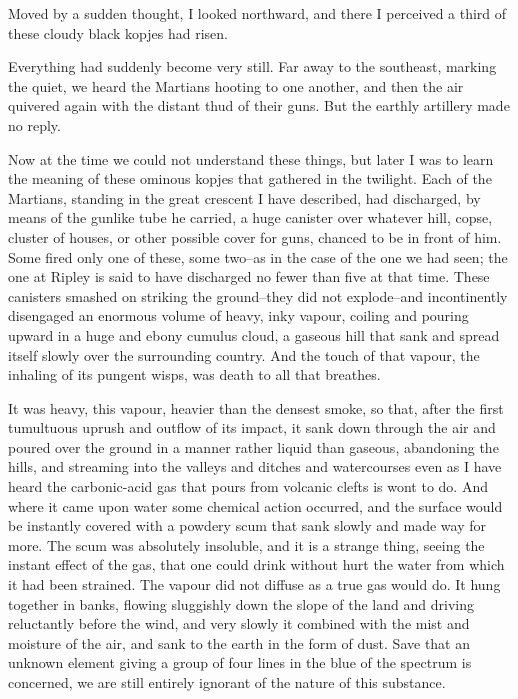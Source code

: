 Moved by a sudden thought, I looked northward, and there I
perceived a third of these cloudy black kopjes had risen.

Everything had suddenly become very still. Far away to the
southeast, marking the quiet, we heard the Martians hooting to one
another, and then the air quivered again with the distant thud of
their guns. But the earthly artillery made no reply.

Now at the time we could not understand these things, but later I
was to learn the meaning of these ominous kopjes that gathered in
the twilight. Each of the Martians, standing in the great crescent
I have described, had discharged, by means of the gunlike tube he
carried, a huge canister over whatever hill, copse, cluster of
houses, or other possible cover for guns, chanced to be in front of
him. Some fired only one of these, some two--as in the case of the
one we had seen; the one at Ripley is said to have discharged no
fewer than five at that time. These canisters smashed on striking
the ground--they did not explode--and incontinently disengaged an
enormous volume of heavy, inky vapour, coiling and pouring upward
in a huge and ebony cumulus cloud, a gaseous hill that sank and
spread itself slowly over the surrounding country. And the touch of
that vapour, the inhaling of its pungent wisps, was death to all
that breathes.

It was heavy, this vapour, heavier than the densest smoke, so that,
after the first tumultuous uprush and outflow of its impact, it
sank down through the air and poured over the ground in a manner
rather liquid than gaseous, abandoning the hills, and streaming
into the valleys and ditches and watercourses even as I have heard
the carbonic-acid gas that pours from volcanic clefts is wont to
do. And where it came upon water some chemical action occurred, and
the surface would be instantly covered with a powdery scum that
sank slowly and made way for more. The scum was absolutely
insoluble, and it is a strange thing, seeing the instant effect of
the gas, that one could drink without hurt the water from which it
had been strained. The vapour did not diffuse as a true gas would
do. It hung together in banks, flowing sluggishly down the slope of
the land and driving reluctantly before the wind, and very slowly
it combined with the mist and moisture of the air, and sank to the
earth in the form of dust. Save that an unknown element giving a
group of four lines in the blue of the spectrum is concerned, we
are still entirely ignorant of the nature of this substance.

